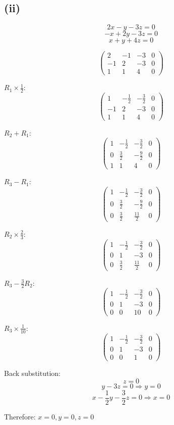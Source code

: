 \subsection*{(ii)}
\[
	2x - y - 3z = 0
\]
\[
	-x + 2y - 3z = 0
\]
\[
	x + y + 4z = 0
\]

\[
	\begin{pmatrix}
		2  & -1 & -3 & 0 \\
		-1 & 2  & -3 & 0 \\
		1  & 1  & 4  & 0
	\end{pmatrix}
\]

$R_1 \times \frac{1}{2}$:
\[
	\begin{pmatrix}
		1  & -\frac{1}{2} & -\frac{3}{2} & 0 \\
		-1 & 2           & -3           & 0 \\
		1  & 1           & 4            & 0
	\end{pmatrix}
\]

$R_2 + R_1$:
\[
	\begin{pmatrix}
		1 & -\frac{1}{2} & -\frac{3}{2} & 0 \\
		0 & \frac{3}{2}  & -\frac{9}{2} & 0 \\
		1 & 1           & 4            & 0
	\end{pmatrix}
\]

$R_3 - R_1$:
\[
	\begin{pmatrix}
		1 & -\frac{1}{2} & -\frac{3}{2} & 0 \\
		0 & \frac{3}{2}  & -\frac{9}{2} & 0 \\
		0 & \frac{3}{2}  & \frac{11}{2} & 0
	\end{pmatrix}
\]

$R_2 \times \frac{2}{3}$:
\[
	\begin{pmatrix}
		1 & -\frac{1}{2} & -\frac{3}{2} & 0 \\
		0 & 1           & -3           & 0 \\
		0 & \frac{3}{2}  & \frac{11}{2} & 0
	\end{pmatrix}
\]

$R_3 - \frac{3}{2}R_2$:
\[
	\begin{pmatrix}
		1 & -\frac{1}{2} & -\frac{3}{2} & 0 \\
		0 & 1           & -3           & 0 \\
		0 & 0           & 10           & 0
	\end{pmatrix}
\]

$R_3 \times \frac{1}{10}$:
\[
	\begin{pmatrix}
		1 & -\frac{1}{2} & -\frac{3}{2} & 0 \\
		0 & 1           & -3           & 0 \\
		0 & 0           & 1            & 0
	\end{pmatrix}
\]

Back substitution:
\[
	z = 0
\]
\[
	y - 3z = 0 \Rightarrow y = 0
\]
\[
	x - \frac{1}{2}y - \frac{3}{2}z = 0 \Rightarrow x = 0
\]

Therefore: $x = 0, y = 0, z = 0$